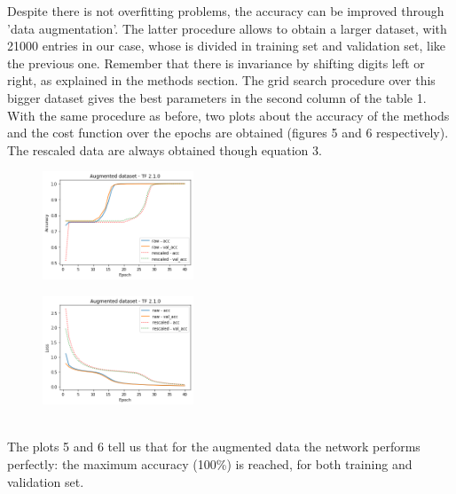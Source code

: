 \documentclass[prl,twocolumn]{revtex4-1}
\begin{document}
Despite there is not overfitting problems, the accuracy can be improved through 'data augmentation'. The latter procedure allows to obtain a larger dataset, with 21000 entries in our case, whose is divided in training set and validation set, like the previous one. Remember that there is invariance by shifting digits left or right, as explained in the methods section. The grid search procedure over this bigger dataset gives the best parameters in the second column of the table 1.
With the same procedure as before, two plots about the accuracy of the methods and the cost function over the epochs are obtained (figures 5 and 6 respectively). The rescaled data are always obtained though equation 3.
\begin{figure}[h]
	\includegraphics[width=0.40\textwidth]{aug_newTF.png}
	\caption{}
	\label{fig:y}
\end{figure}
\begin{figure}[h!!!]
	\includegraphics[width=0.40\textwidth]{aug_newTFloss.png}
	\caption{}
	\label{fig:y}
\end{figure}
\\
The plots 5 and 6 tell us that for the augmented data the network performs perfectly: the maximum accuracy (100\%) is reached, for both training and validation set.
\end{document}
